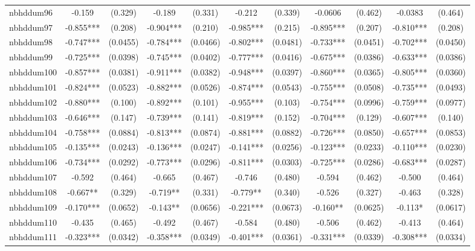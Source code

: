 \documentclass[]{article}
\begin{document}
\begin{tabular}{lcccccccccc}
nbhddum96 & -0.159 & (0.329) & -0.189 & (0.331) & -0.212 & (0.339) & -0.0606 & (0.462) & -0.0383 & (0.464) \\
nbhddum97 & -0.855*** & (0.208) & -0.904*** & (0.210) & -0.985*** & (0.215) & -0.895*** & (0.207) & -0.810*** & (0.208) \\
nbhddum98 & -0.747*** & (0.0455) & -0.784*** & (0.0466) & -0.802*** & (0.0481) & -0.733*** & (0.0451) & -0.702*** & (0.0450) \\
nbhddum99 & -0.725*** & (0.0398) & -0.745*** & (0.0402) & -0.777*** & (0.0416) & -0.675*** & (0.0386) & -0.633*** & (0.0386) \\
nbhddum100 & -0.857*** & (0.0381) & -0.911*** & (0.0382) & -0.948*** & (0.0397) & -0.860*** & (0.0365) & -0.805*** & (0.0360) \\
nbhddum101 & -0.824*** & (0.0523) & -0.882*** & (0.0526) & -0.874*** & (0.0543) & -0.755*** & (0.0508) & -0.735*** & (0.0493) \\
nbhddum102 & -0.880*** & (0.100) & -0.892*** & (0.101) & -0.955*** & (0.103) & -0.754*** & (0.0996) & -0.759*** & (0.0977) \\
nbhddum103 & -0.646*** & (0.147) & -0.739*** & (0.141) & -0.819*** & (0.152) & -0.704*** & (0.129) & -0.607*** & (0.140) \\
nbhddum104 & -0.758*** & (0.0884) & -0.813*** & (0.0874) & -0.881*** & (0.0882) & -0.726*** & (0.0850) & -0.657*** & (0.0853) \\
nbhddum105 & -0.135*** & (0.0243) & -0.136*** & (0.0247) & -0.141*** & (0.0256) & -0.123*** & (0.0233) & -0.110*** & (0.0230) \\
nbhddum106 & -0.734*** & (0.0292) & -0.773*** & (0.0296) & -0.811*** & (0.0303) & -0.725*** & (0.0286) & -0.683*** & (0.0287) \\
nbhddum107 & -0.592 & (0.464) & -0.665 & (0.467) & -0.746 & (0.480) & -0.594 & (0.462) & -0.500 & (0.464) \\
nbhddum108 & -0.667** & (0.329) & -0.719** & (0.331) & -0.779** & (0.340) & -0.526 & (0.327) & -0.463 & (0.328) \\
nbhddum109 & -0.170*** & (0.0652) & -0.143** & (0.0656) & -0.221*** & (0.0673) & -0.160** & (0.0625) & -0.113* & (0.0617) \\
nbhddum110 & -0.435 & (0.465) & -0.492 & (0.467) & -0.584 & (0.480) & -0.506 & (0.462) & -0.413 & (0.464) \\
nbhddum111 & -0.323*** & (0.0342) & -0.358*** & (0.0349) & -0.401*** & (0.0361) & -0.331*** & (0.0339) & -0.308*** & (0.0334) \\

\end{tabular}
\end{document}
